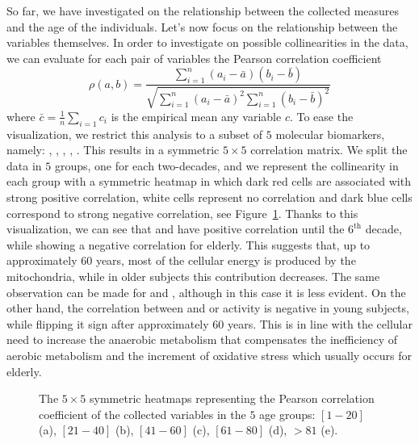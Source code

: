 So far, we have investigated on the relationship between the collected measures and the age of the individuals. Let's now focus on the relationship between the variables themselves. In order to investigate on possible collinearities in the data, we can evaluate for each pair of variables the Pearson correlation coefficient
$$
	\rho(a, b) = \frac{\sum_{i=1}^n (a_i - \bar a)(b_i - \bar b)}{\sqrt{\sum_{i=1}^n(a_i-\bar a)^2 \sum_{i=1}^n(b_i-\bar b)^2}}
$$
where $\bar c = \frac{1}{n}\sum_{i=1} c_i$ is the empirical mean any variable $c$.
To ease the visualization, we restrict this analysis to a subset of $5$ molecular biomarkers, namely: \popyrmal, \posucc, \atpamp, \ldh, \mda.
This results in a symmetric $5 \times 5$ correlation matrix.
We split the data in $5$ groups, one for each two-decades, and we represent the collinearity in each group with a symmetric heatmap in which dark red cells are associated with strong positive correlation, white cells represent no correlation and dark blue cells correspond to strong negative correlation, see Figure~\ref{fig:heatmaps}.
Thanks to this visualization, we can see that \atpamp and \popyrmal have positive correlation until the $6^{\text{th}}$ decade, while showing a negative correlation for elderly.
This suggests that, up to approximately $60$ years, most of the cellular energy is produced by the mitochondria, while in older subjects this contribution decreases. The same observation can be made for \atpamp and \posucc, although in this case it is less evident. On the other hand, the correlation between \atpamp and \mda or \ldh activity is negative in young subjects, while flipping it sign after approximately $60$ years.
This is in line with the cellular need to increase the anaerobic metabolism that compensates the inefficiency of aerobic metabolism and the increment of oxidative stress which usually occurs for elderly.

\begin{figure}[]
	\centering
		\hfill%
   \hfill
	\caption{The $5 \times 5$ symmetric heatmaps representing the Pearson correlation coefficient of the collected variables in the $5$ age groups: $[1-20]$ (a), $[21-40]$ (b), $[41-60]$ (c), $[61-80]$ (d), $>81$ (e).} \label{fig:heatmaps}
\end{figure}


